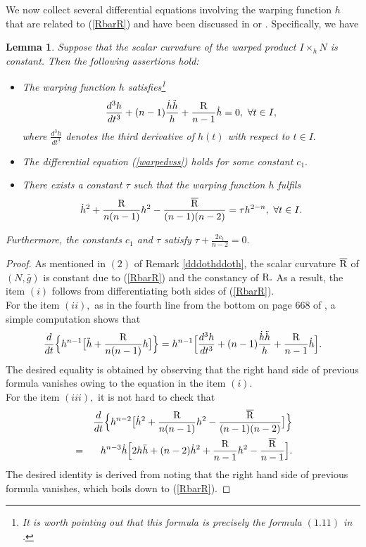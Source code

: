 \documentclass[10pt,leqno,oneside]{amsart}
\newtheorem{Lem}{Lemma}
\begin{document}
{            We now collect several differential equations involving the warping function $h$ that are related to (\ref{RbarR}) and have been discussed in \cite{Kobayashi1982} or \cite{Lafontaine1983}. Specifically, we have
    \begin{Lem}\label{IN}
            Suppose that the scalar curvature of the warped product $I\times_h N $ is constant. Then the following assertions hold:
            \begin{itemize}[leftmargin=0.6cm, itemindent=0.4cm]
              \item[(i).]  The warping function $h$ satisfies\footnote{It is worth pointing out that this formula is precisely the formula $(1.11)$ in \cite{Kobayashi1982}.}
                           $$\frac{d^3h}{dt^3}+(n-1)\frac{\dot{h}\ddot{h}}{h}+\frac{{\rm{R}}}{n-1}\dot{h}=0, ~\forall t\in I,$$
                           where $\frac{d^3h}{dt^3}$ denotes the third derivative of $h(t)$ with respect to $t\in I.$
              \item[(ii).] The differential equation {\rm(\ref{warpedvss})} holds for some constant $c_1.$
              \item[(iii).] There exists a constant $\tau$ such that the warping function $h$ fulfils
                          \[\dot{h}^2+\frac{{\rm{R}}}{n(n-1)}h^2-\frac{\overline{{\rm{R}}}}{(n-1)(n-2)}=\tau h^{2-n}, ~\forall t\in I.\]
            \end{itemize}
            Furthermore, the constants $c_1$ and $\tau$ satisfy $\tau+\frac{2c_1}{n-2}=0.$
    \end{Lem}
    \begin{proof}
           As mentioned in $(2)$ of Remark \ref{dddothddoth}, the scalar curvature $\overline{{\rm{R}}}$ of $(N, \bar{g})$ is constant due to (\ref{RbarR}) and the constancy of ${\rm R}.$ As a result, the item $(i)$ follows from differentiating both sides of (\ref{RbarR}).\\
           For the item $(ii),$ as in the fourth line from the bottom on page 668 of \cite{Kobayashi1982}, a simple computation shows that
           \[\frac{d}{dt}\Big\{h^{n-1}\big[\ddot{h}+\frac{{\rm{R}}}{n(n-1)}h\big]\Big\}=h^{n-1}\Big[\frac{d^3h}{dt^3}+(n-1)\frac{\dot{h}\ddot{h}}{h}+\frac{{\rm{R}}}{n-1}\dot{h}\Big].\]
           The desired equality is obtained by observing that the right hand side of previous formula vanishes owing to the equation in the item $(i)$.\\
           For the item $(iii),$ it is not hard to check that
           \begin{eqnarray*}
           &&\frac{d}{dt}\Big\{h^{n-2}\big[\dot{h}^2+\frac{{\rm{R}}}{n(n-1)}h^2-\frac{\overline{{\rm{R}}}}{(n-1)(n-2)}\big]\Big\}\\
              &=&h^{n-3}\dot{h}\Big[2h\ddot{h}+(n-2)\dot{h}^2+\frac{{\rm{R}}}{n-1}{h}^2-\frac{\overline{{\rm{R}}}}{n-1}\Big].
           \end{eqnarray*}
           The desired identity is derived from noting that the right hand side of previous formula vanishes, which boils down to (\ref{RbarR}).


\end{proof}}
\end{document}
